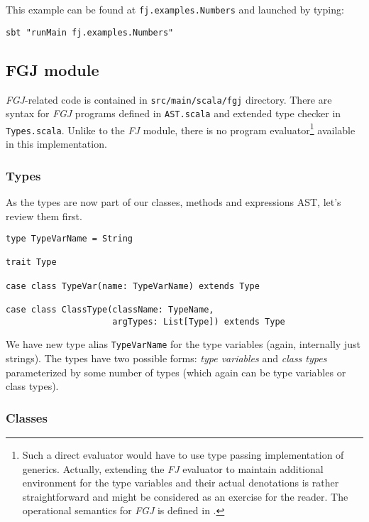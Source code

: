 \documentclass{article}[12pt]
\begin{document}
This example can be found at \texttt{fj.examples.Numbers}
and launched by typing:

\begin{verbatim}
sbt "runMain fj.examples.Numbers"
\end{verbatim}


\subsection{FGJ module}

\emph{FGJ}-related code is contained in \texttt{src/main/scala/fgj}
directory. There are syntax for \emph{FGJ} programs defined in
\texttt{AST.scala} and extended type checker in \texttt{Types.scala}. 
Unlike to the \emph{FJ} module, there is no program
evaluator\footnote{Such a direct evaluator would have to use type
passing implementation of generics. Actually, extending the \emph{FJ}
evaluator to maintain additional environment for the type variables
and their actual denotations is rather straightforward and might
be considered as an exercise for the reader. The operational
semantics for \emph{FGJ} is defined in \cite{fj}.} available
in this implementation.

\subsubsection{Types}

As the types are now part of our classes, methods and expressions
AST, let's review them first.

\begin{verbatim}
type TypeVarName = String

trait Type

case class TypeVar(name: TypeVarName) extends Type

case class ClassType(className: TypeName,
                     argTypes: List[Type]) extends Type
\end{verbatim}

We have new type alias \texttt{TypeVarName} for the type variables
(again, internally just strings). The types have two possible forms:
\emph{type variables} and \emph{class types} parameterized by
some number of types (which again can be type variables or
class types).

\subsubsection{Classes}
\end{document}
